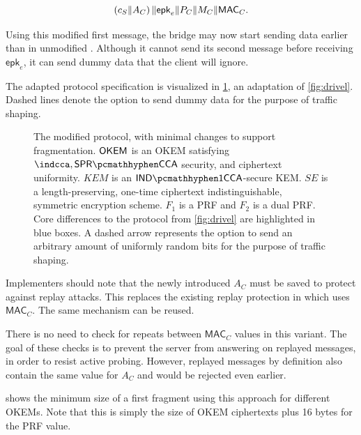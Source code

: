\[
    \left( c_S \| A_C \right) \| \mathsf{epk}_e \| P_C \| M_C \| \mathsf{MAC}_C .
\]

Using this modified first message, the bridge may now start sending data earlier than in unmodified \drivel{}. Although it cannot send its second message before receiving $\mathsf{epk}_e$, it can send dummy data that the client will ignore.

The adapted protocol specification is visualized in \cref{fig:modified-drivel-minimal}, an adaptation of \cref{fig:drivel}. Dashed lines denote the option to send dummy data for the purpose of traffic shaping.

\begin{figure}
    
    \caption[
        The modified \drivel{} protocol, with minimal changes to support fragmentation.
    ]{
        The modified \drivel{} protocol, with minimal changes to support fragmentation.
        $\mathsf{OKEM}$ is an OKEM satisfying $\indcca, \sprcca$ security, and ciphertext uniformity.
        $KEM$ is an $\indonecca$-secure KEM.
        $SE$ is a length-preserving, one-time ciphertext indistinguishable, symmetric encryption scheme.
        $F_1$ is a PRF and $F_2$ is a dual PRF.
        Core differences to the \drivel{} protocol from \cref{fig:drivel} are highlighted in blue boxes.
        A dashed arrow represents the option to send an arbitrary amount of uniformly random bits for the purpose of traffic shaping.
    }
    \label{fig:modified-drivel-minimal}
\end{figure}

Implementers should note that the newly introduced $A_C$ must be saved to protect against replay attacks. This replaces the existing replay protection in \obfsfour{} which uses $\mathsf{MAC}_C$. The same mechanism can be reused.

There is no need to check for repeats between $\mathsf{MAC}_C$ values in this variant. The goal of these checks is to prevent the server from answering on replayed messages, in order to resist active probing.
However, replayed messages by definition also contain the same value for $A_C$ and would be rejected even earlier.

 shows the minimum size of a first fragment using this approach for different OKEMs. Note that this is simply the size of OKEM ciphertexts plus 16 bytes for the PRF value.

